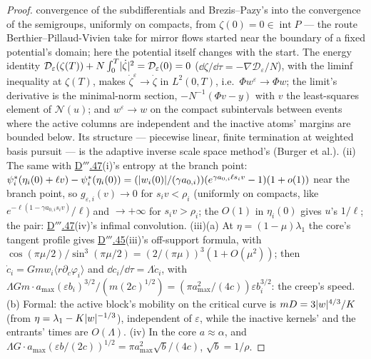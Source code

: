 \begin{proof}
convergence of the subdifferentials and Brezis--Pazy's into the convergence of the semigroups, uniformly on compacts,
from $\zeta(0) = 0\in\operatorname{int}P$ --- the route Berthier--Pillaud-Vivien take for mirror flows started near the
boundary of a fixed potential's domain; here the potential itself changes with the start. The energy identity
$\mathcal D_\varepsilon(\zeta(T)) + N\int_0^T\lvert \dot\zeta\rvert^2 = \mathcal D_\varepsilon(0) = 0$
($\dd\zeta/\dd\tau = -\nabla\mathcal D_\varepsilon/N$), with the liminf inequality at $\zeta(T)$, makes
$\dot\zeta^\varepsilon\to\dot\zeta$ in $L^2(0,T)$, i.e.\ $\Phi w^\varepsilon\to\Phi w$; the limit's derivative is the
minimal-norm section, $-N^{-1}(\Phi v - y)$ with $v$ the least-squares element of $\mathcal N(u)$; and
$w^\varepsilon\to w$ on the compact subintervals between events where the active columns are independent and the
inactive atoms' margins are bounded below. Its structure --- piecewise linear, finite termination at weighted basis
pursuit --- is the adaptive inverse scale space method's (Burger et al.). (ii) The same with
\hyperref[res:thmDppp:47]{D$'''$.47}(i)'s entropy at the branch point:
$\psi^*_i(\eta_i(0) + \ell v) - \psi^*_i(\eta_i(0))
= (\lvert w_i(0)\rvert/(\gamma a_{0,i}))(e^{\gamma a_{0,i}\ell s_iv} - 1)(1 + o(1))$ near the branch point, so
$g_{\varepsilon,i}(v)\to0$ for $s_iv < \rho_i$ (uniformly on compacts, like
$e^{-\ell(1 - \gamma a_{0,i}s_iv)}/\ell$) and $\to+\infty$ for $s_iv > \rho_i$; the $O(1)$ in $\eta_i(0)$ gives $u$'s
$1/\ell$; the pair: \hyperref[res:thmDppp:47]{D$'''$.47}(iv)'s infimal convolution. (iii)(a) At
$\eta = (1 - \mu)\lambda_1$ the core's tangent profile gives \hyperref[res:thmDppp:45]{D$'''$.45}(iii)'s off-support
formula, with $\cos(\pi\mu/2)/\sin^3(\pi\mu/2) = (2/(\pi\mu))^3(1 + O(\mu^2))$; then
$\dot c_i = Gmw_i\langle r\partial_c\varphi_i\rangle$ and $\dd c_i/\dd\tau = \Lambda\dot c_i$, with
$\Lambda Gm\cdot a_{\max}(\varepsilon b_i)^{3/2}/(m(2c)^{1/2}) = (\pi a_{\max}^2/(4c))\varepsilon b_i^{3/2}$: the
creep's speed. (b) Formal: the active block's mobility on the critical curve is $mD = 3\lvert w\rvert^{4/3}/K$ (from
$\eta = \lambda_1 - K\lvert w\rvert^{-1/3}$), independent of $\varepsilon$, while the inactive kernels' and the entrants' times
are $O(\Lambda)$. (iv) In the core $a\approx\alpha$, and
$\Lambda G\cdot a_{\max}(\varepsilon b/(2c))^{1/2} = \pi a_{\max}^2\sqrt b/(4c)$, $\sqrt b = 1/\rho$.
\end{proof}

